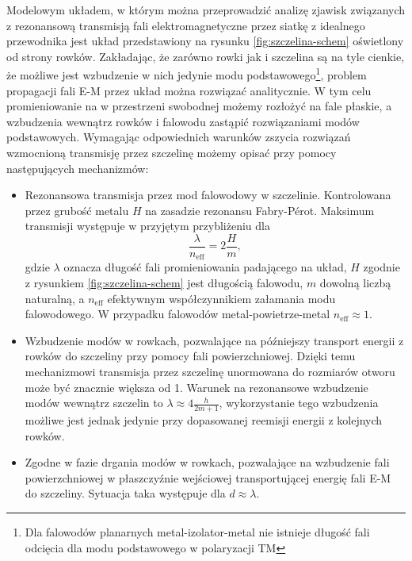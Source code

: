 Modelowym układem, w którym można przeprowadzić analizę zjawisk związanych z rezonansową transmisją fali elektromagnetyczne przez siatkę z idealnego przewodnika jest układ przedstawiony na rysunku \ref{fig:szczelina-schem} oświetlony od strony rowków. Zakładając, że zarówno rowki jak i szczelina są na tyle cienkie, że możliwe jest wzbudzenie w nich jedynie modu podstawowego\footnote{Dla falowodów planarnych metal-izolator-metal nie istnieje długość fali odcięcia dla modu podstawowego w polaryzacji TM}, problem propagacji fali E-M przez układ można rozwiązać analitycznie. W tym celu promieniowanie na w przestrzeni swobodnej możemy rozłożyć na fale płaskie, a wzbudzenia wewnątrz rowków i falowodu zastąpić rozwiązaniami modów podstawowych. Wymagając odpowiednich warunków zszycia rozwiązań wzmocnioną transmisję przez szczelinę możemy opisać przy pomocy następujących mechanizmów\cite{martin2001theory}:
\begin{itemize}
	\item Rezonansowa transmisja przez mod falowodowy w szczelinie. Kontrolowana przez grubość metalu $H$ na zasadzie rezonansu Fabry-P\'{e}rot. Maksimum transmisji występuje w przyjętym przybliżeniu dla
\begin{equation}
\frac{\lambda}{n_{\textrm{eff}}} = 2 \frac {H}{m},
\label{eq:fp-szczelina}
\end{equation}
gdzie $\lambda$ oznacza długość fali promieniowania padającego na układ, $H$ zgodnie z rysunkiem \ref{fig:szczelina-schem} jest długością falowodu, $m$ dowolną liczbą naturalną, a $n_{\textrm{eff}}$ efektywnym współczynnikiem załamania modu falowodowego. W przypadku falowodów metal-powietrze-metal $n_{\textrm{eff}} \approx 1$.
	\item Wzbudzenie modów w rowkach, pozwalające na późniejszy transport energii z rowków do szczeliny przy pomocy fali powierzchniowej. Dzięki temu mechanizmowi transmisja przez szczelinę unormowana do rozmiarów otworu może być znacznie większa od 1. Warunek na rezonansowe wzbudzenie modów wewnątrz szczelin to $\lambda \approx 4 \frac {h}{2m+1}$, wykorzystanie tego wzbudzenia możliwe jest jednak jedynie przy dopasowanej reemisji energii z kolejnych rowków.
	\item Zgodne w fazie drgania modów w rowkach, pozwalające na wzbudzenie fali powierzchniowej w płaszczyźnie wejściowej transportującej energię fali E-M do szczeliny. Sytuacja taka występuje dla $d \approx \lambda$.
\end{itemize}



